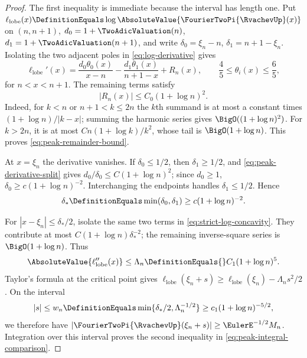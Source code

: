 \documentclass[11pt,oneside]{article}
\numberwithin{equation}{section}
\theoremstyle{definition}
\theoremstyle{remark}
\newcommand{\LobeLogAmplitude}{\ell_{\mathrm{lobe}}}
\begin{document}
\begin{proof}
The first inequality is immediate because the interval has length one.  Put
$\LobeLogAmplitude(x)\DefinitionEquals
\log\AbsoluteValue{\FourierTwoPi{\RvachevUp}(x)}$ on $(n,n+1)$,
$d_0=1+\TwoAdicValuation(n)$, $d_1=1+\TwoAdicValuation(n+1)$, and write
$\delta_0=\xi_n-n$, $\delta_1=n+1-\xi_n$.  Isolating the two adjacent poles in
\eqref{eq:log-derivative} gives
\begin{equation}
 \LobeLogAmplitude'(x)=\frac{d_0\theta_0(x)}{x-n}
       -\frac{d_1\theta_1(x)}{n+1-x}+R_n(x),
 \qquad \frac45\le\theta_i(x)\le\frac65,
 \label{eq:peak-derivative-split}
\end{equation}
for $n<x<n+1$.  The remaining terms satisfy
\begin{equation}
 |R_n(x)|\le C_0(1+\log n)^2.
 \label{eq:peak-remainder-bound}
\end{equation}
Indeed, for $k< n$ or $n+1<k\le2n$ the $k$th summand is at most a constant times
$(1+\log n)/|k-x|$; summing the harmonic series gives
$\BigO((1+\log n)^2)$.  For $k>2n$, it is at most
$C n(1+\log k)/k^2$, whose tail is $\BigO(1+\log n)$.  This proves
\eqref{eq:peak-remainder-bound}.

At $x=\xi_n$ the derivative vanishes.  If $\delta_0\le1/2$, then
$\delta_1\ge1/2$, and \eqref{eq:peak-derivative-split} gives
$d_0/\delta_0\le C(1+\log n)^2$; since $d_0\ge1$,
$\delta_0\ge c(1+\log n)^{-2}$.  Interchanging the endpoints handles
$\delta_1\le1/2$.  Hence
\begin{equation}
 \delta_*\DefinitionEquals\min(\delta_0,\delta_1)
 \ge c(1+\log n)^{-2}.
 \label{eq:peak-endpoint-distance}
\end{equation}

For $|x-\xi_n|\le\delta_*/2$, isolate the same two terms in
\eqref{eq:strict-log-concavity}.  They contribute at most
$C(1+\log n)\delta_*^{-2}$; the remaining inverse-square series is
$\BigO(1+\log n)$.  Thus
\begin{equation}
 \AbsoluteValue{\LobeLogAmplitude''(x)}
 \le\Lambda_n\DefinitionEquals{}C_1(1+\log n)^5.
 \label{eq:peak-curvature-bound}
\end{equation}
Taylor's formula at the critical point gives
$\LobeLogAmplitude(\xi_n+s)\ge
\LobeLogAmplitude(\xi_n)-\Lambda_ns^2/2$.  On the interval
\[
 |s|\le w_n\DefinitionEquals\min\{\delta_*/2,\Lambda_n^{-1/2}\}
 \ge c_1(1+\log n)^{-5/2},
\]
we therefore have $|\FourierTwoPi{\RvachevUp}(\xi_n+s)|\ge\EulerE^{-1/2}M_n$.  Integration over
this interval proves the second inequality in
\eqref{eq:peak-integral-comparison}.
\end{proof}
\end{document}
